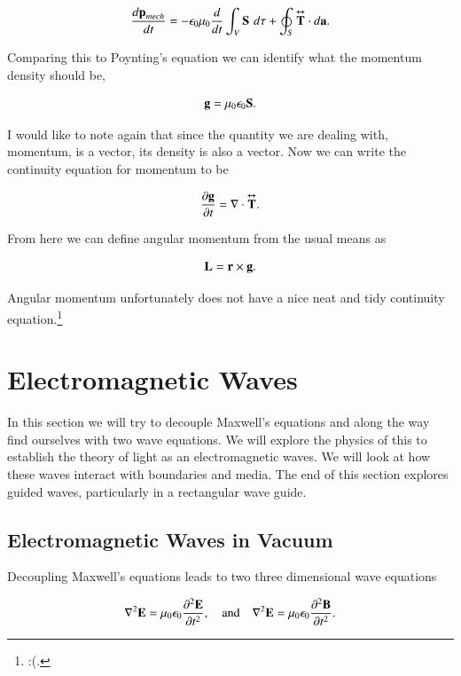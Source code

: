 \documentclass[preprint, review,12pt]{elsarticle}
\def\x{\times}
\def\.{\cdot}
\def\b{\textbf}
\def\div{\nabla \.}
\def\lap{\nabla^2}
\def\and{\quad \text{and} \quad}
\newcommand{\pd}[2]{\frac{\partial #1 }{\partial #2}}
\newcommand{\pds}[2]{\frac{\partial^2 #1 }{\partial {#2}^2}}
\newcommand{\td}[2]{\frac{d #1 }{d #2}}
\newcommand{\tup}[1]{\overset{\text{\tiny $\bm\leftrightarrow $}}{\b #1}}
\begin{document}
\begin{equation}
    \td{\b p_{mech}}{t} = -\epsilon_0 \mu_0 \td{}{t}\int_V \b S \hspace{3.5pt} d\tau + \oint_S \tup{T} \. d\b a.
\end{equation}

Comparing this to Poynting's equation we can identify what the momentum density should be,

\begin{equation}
    \b g = \mu_0\epsilon_0 \b S.
\end{equation}

I would like to note again that since the quantity we are dealing with, momentum, is a vector, its density is also a vector. Now we can write the continuity equation for momentum to be

\begin{equation}
    \pd{\b g}{t} = \div \tup{T}.
\end{equation}

From here we can define angular momentum from the usual means as 

\begin{equation}
    \b L = \b r \x \b g.
\end{equation}

Angular momentum unfortunately does not have a nice neat and tidy continuity equation.\footnote{:(.}

\section{Electromagnetic Waves}

In this section we will try to decouple Maxwell's equations and along the way find ourselves with two wave equations. We will explore the physics of this to establish the theory of light as an electromagnetic waves. We will look at how these waves interact with boundaries and media. The end of this section explores guided waves, particularly in a rectangular wave guide.

\subsection{Electromagnetic Waves in Vacuum}

Decoupling Maxwell's equations leads to two three dimensional wave equations

\begin{equation}
    \lap \b E = \mu_0 \epsilon_0 \pds{\b E}{t}, \and \lap \b E = \mu_0 \epsilon_0 \pds{\b B}{t}.
\end{equation}
\end{document}
